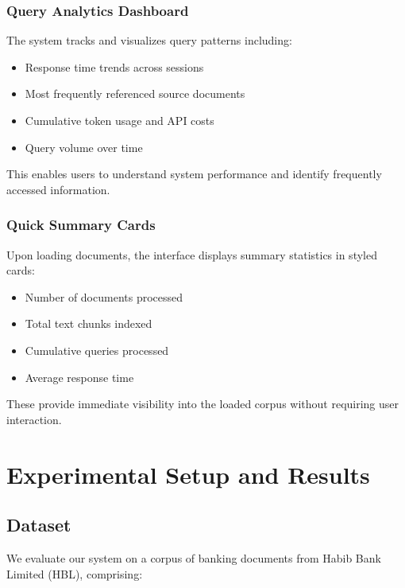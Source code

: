\documentclass[runningheads]{llncs}
\begin{document}
\subsubsection{Query Analytics Dashboard}

The system tracks and visualizes query patterns including:

\begin{itemize}
    \item Response time trends across sessions
    \item Most frequently referenced source documents
    \item Cumulative token usage and API costs
    \item Query volume over time
\end{itemize}

This enables users to understand system performance and identify frequently accessed information.

\subsubsection{Quick Summary Cards}

Upon loading documents, the interface displays summary statistics in styled cards:

\begin{itemize}
    \item Number of documents processed
    \item Total text chunks indexed
    \item Cumulative queries processed
    \item Average response time
\end{itemize}

These provide immediate visibility into the loaded corpus without requiring user interaction.

\section{Experimental Setup and Results}

\subsection{Dataset}

We evaluate our system on a corpus of banking documents from Habib Bank Limited (HBL), comprising:
\end{document}
